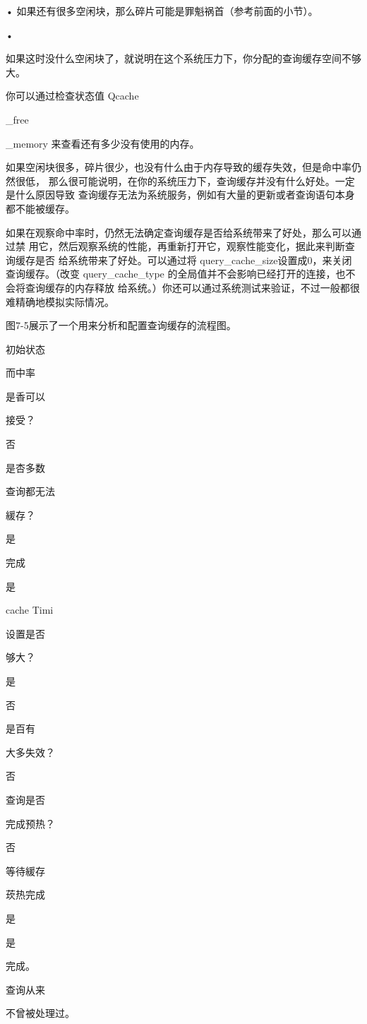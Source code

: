 • 如果还有很多空闲块，那么碎片可能是罪魁祸首（参考前面的小节）。

•

如果这时没什么空闲块了，就说明在这个系统压力下，你分配的查询缓存空间不够大。

你可以通过检查状态值 Qcache

\_free

\_memory 来查看还有多少没有使用的内存。

如果空闲块很多，碎片很少，也没有什么由于内存导致的缓存失效，但是命中率仍然很低，
那么很可能说明，在你的系统压力下，查询缓存并没有什么好处。一定是什么原因导致
查询缓存无法为系统服务，例如有大量的更新或者查询语句本身都不能被缓存。

如果在观察命中率时，仍然无法确定查询缓存是否给系统带来了好处，那么可以通过禁
用它，然后观察系统的性能，再重新打开它，观察性能变化，据此来判断查询缓存是否
给系统带来了好处。可以通过将 query\_cache\_size设置成0，来关闭查询缓存。（改变
query\_cache\_type 的全局值并不会影响已经打开的连接，也不会将查询缓存的内存释放
给系统。）你还可以通过系统测试来验证，不过一般都很难精确地模拟实际情况。

图7-5展示了一个用来分析和配置查询缓存的流程图。

初始状态

而中率

是香可以

接受？

否

是杏多数

查询都无法

緩存？

是

完成

是

cache Timi

设置是否

够大？

是

否

是百有

大多失效？

否

查询是否

完成预热？

否

等待緩存

莰热完成

是

是

完成。

查询从来

不曾被处理过。

